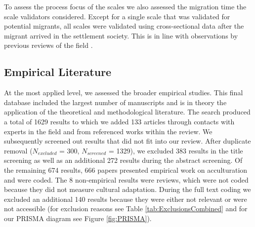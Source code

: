 To assess the process focus of the scales we also assessed the migration
time the scale validators considered. Except for a single scale that was
validated for potential migrants, all scales were validated using
cross-sectional data after the migrant arrived in the settlement
society. This is in line with observations by previous reviews of the
field \citep[e.g.,][]{Brown2011}.

\subsection{Empirical Literature}

At the most applied level, we assessed the broader empirical studies.
This final database included the largest number of manuscripts and is in
theory the application of the theoretical and methodological literature.
The search produced a total of 1629 results to which we added 133
articles through contacts with experts in the field and from referenced
works within the review. We subsequently screened out results that did
not fit into our review. After duplicate removal (\(N_{excluded}\) =
300, \(N_{screened}\) = 1329), we excluded 383 results in the title
screening as well as an additional 272 results during the abstract
screening. Of the remaining 674 results, 666 papers presented empirical
work on acculturation and were coded. The 8 non-empirical results were
reviews, which were not coded because they did not measure cultural
adaptation. During the full text coding we excluded an additional 140
results because they were either not relevant or were not accessible
(for exclusion reasons see Table \ref{tab:ExclusionsCombined} and for
our PRISMA diagram see Figure \ref{fig:PRISMA}).

